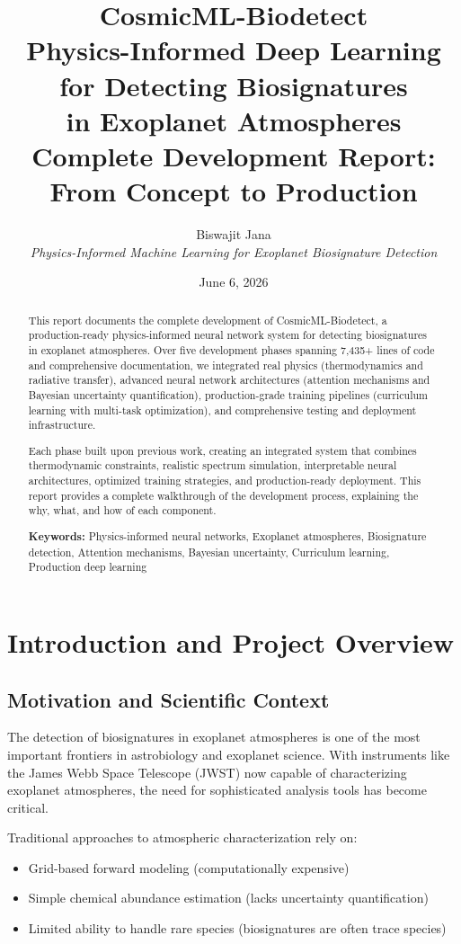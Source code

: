 \documentclass[12pt,a4paper,oneside]{report}
\title{\textbf{CosmicML-Biodetect}\\[12pt]
\Large Physics-Informed Deep Learning for Detecting Biosignatures\\in Exoplanet Atmospheres\\[12pt]
\large Complete Development Report: From Concept to Production}}
\author{Biswajit Jana\\[6pt]
\textit{Physics-Informed Machine Learning for Exoplanet Biosignature Detection}}
\date{June 6, 2026}
\begin{document}
\maketitle

\begin{abstract}
This report documents the complete development of CosmicML-Biodetect, a production-ready physics-informed neural network system for detecting biosignatures in exoplanet atmospheres. Over five development phases spanning 7,435+ lines of code and comprehensive documentation, we integrated real physics (thermodynamics and radiative transfer), advanced neural network architectures (attention mechanisms and Bayesian uncertainty quantification), production-grade training pipelines (curriculum learning with multi-task optimization), and comprehensive testing and deployment infrastructure.

Each phase built upon previous work, creating an integrated system that combines thermodynamic constraints, realistic spectrum simulation, interpretable neural architectures, optimized training strategies, and production-ready deployment. This report provides a complete walkthrough of the development process, explaining the why, what, and how of each component.

\noindent\textbf{Keywords:} Physics-informed neural networks, Exoplanet atmospheres, Biosignature detection, Attention mechanisms, Bayesian uncertainty, Curriculum learning, Production deep learning
\end{abstract}

\tableofcontents
\newpage

\chapter{Introduction and Project Overview}

\section{Motivation and Scientific Context}

The detection of biosignatures in exoplanet atmospheres is one of the most important frontiers in astrobiology and exoplanet science. With instruments like the James Webb Space Telescope (JWST) now capable of characterizing exoplanet atmospheres, the need for sophisticated analysis tools has become critical.

Traditional approaches to atmospheric characterization rely on:
\begin{itemize}
    \item Grid-based forward modeling (computationally expensive)
    \item Simple chemical abundance estimation (lacks uncertainty quantification)
    \item Limited ability to handle rare species (biosignatures are often trace species)
\end{itemize}
\end{document}
